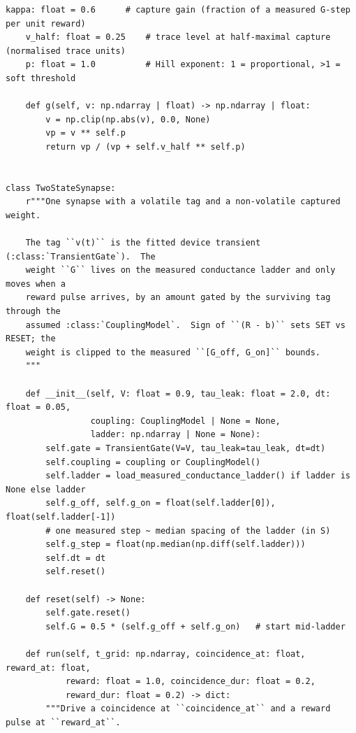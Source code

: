 \begin{lstlisting}[caption={mrl\_trace/capture.py},label={lst:siox-src-capture}]
    kappa: float = 0.6      # capture gain (fraction of a measured G-step per unit reward)
    v_half: float = 0.25    # trace level at half-maximal capture (normalised trace units)
    p: float = 1.0          # Hill exponent: 1 = proportional, >1 = soft threshold

    def g(self, v: np.ndarray | float) -> np.ndarray | float:
        v = np.clip(np.abs(v), 0.0, None)
        vp = v ** self.p
        return vp / (vp + self.v_half ** self.p)


class TwoStateSynapse:
    r"""One synapse with a volatile tag and a non-volatile captured weight.

    The tag ``v(t)`` is the fitted device transient (:class:`TransientGate`).  The
    weight ``G`` lives on the measured conductance ladder and only moves when a
    reward pulse arrives, by an amount gated by the surviving tag through the
    assumed :class:`CouplingModel`.  Sign of ``(R - b)`` sets SET vs RESET; the
    weight is clipped to the measured ``[G_off, G_on]`` bounds.
    """

    def __init__(self, V: float = 0.9, tau_leak: float = 2.0, dt: float = 0.05,
                 coupling: CouplingModel | None = None,
                 ladder: np.ndarray | None = None):
        self.gate = TransientGate(V=V, tau_leak=tau_leak, dt=dt)
        self.coupling = coupling or CouplingModel()
        self.ladder = load_measured_conductance_ladder() if ladder is None else ladder
        self.g_off, self.g_on = float(self.ladder[0]), float(self.ladder[-1])
        # one measured step ~ median spacing of the ladder (in S)
        self.g_step = float(np.median(np.diff(self.ladder)))
        self.dt = dt
        self.reset()

    def reset(self) -> None:
        self.gate.reset()
        self.G = 0.5 * (self.g_off + self.g_on)   # start mid-ladder

    def run(self, t_grid: np.ndarray, coincidence_at: float, reward_at: float,
            reward: float = 1.0, coincidence_dur: float = 0.2,
            reward_dur: float = 0.2) -> dict:
        """Drive a coincidence at ``coincidence_at`` and a reward pulse at ``reward_at``.


\end{lstlisting}
